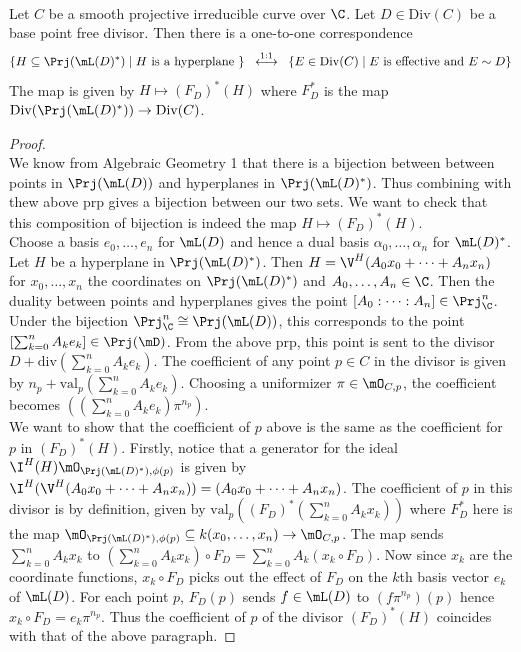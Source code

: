 \documentclass[a4paper]{article}
\begin{document}
\begin{prp}{}{}\\
Let $C$ be a smooth projective irreducible curve over $\C$. Let $D\in\text{Div}(C)$ be a base point free divisor. Then there is a one-to-one correspondence $$\{H\subseteq\Prj(\mL(D)^\ast)\;|\;H\text{ is a hyperplane }\}\;\;\overset{1:1}{\longleftrightarrow}\;\;\{E\in\text{Div}(C)\;|\;E\text{ is effective and }E\sim D\}$$ The map is given by $H\mapsto(F_D)^\ast(H)$ where $F_D^\ast$ is the map $\text{Div}(\Prj(\mL(D)^\ast))\to\text{Div}(C)$. 
\begin{proof}\\
We know from Algebraic Geometry 1 that there is a bijection between between points in $\Prj(\mL(D))$ and hyperplanes in $\Prj(\mL(D)^\ast)$. Thus combining with thew above prp gives a bijection between our two sets. We want to check that this composition of bijection is indeed the map $H\mapsto(F_D)^\ast(H)$. \\

Choose a basis $e_0,\dots,e_n$ for $\mL(D)$ and hence a dual basis $\alpha_0,\dots,\alpha_n$ for $\mL(D)^\ast$. Let $H$ be a hyperplane in $\Prj(\mL(D)^\ast)$. Then $H=\V^H(A_0x_0+\dots+A_nx_n)$ for $x_0,\dots,x_n$ the coordinates on $\Prj(\mL(D)^\ast)$ and $A_0,\dots,A_n\in\C$. Then the duality between points and hyperplanes gives the point $[A_0:\cdots:A_n]\in\Prj_\C^n$. Under the bijection $\Prj_\C^n\cong\Prj(\mL(D))$, this corresponds to the point $\left[\sum_{k=0}^nA_ke_k\right]\in\Prj(\mD)$. From the above prp, this point is sent to the divisor $D+\text{div}\left(\sum_{k=0}^nA_ke_k\right)$. The coefficient of any point $p\in C$ in the divisor is given by $n_p+\text{val}_p\left(\sum_{k=0}^nA_ke_k\right)$. Choosing a uniformizer $\pi\in\mO_{C,p}$, the coefficient becomes $\left(\left(\sum_{k=0}^nA_ke_k\right)\pi^{n_p}\right)$. \\

We want to show that the coefficient of $p$ above is the same as the coefficient for $p$ in $(F_D)^\ast(H)$. Firstly, notice that a generator for the ideal $\I^H(H)\mO_{\Prj(\mL(D)^\ast),\phi(p)}$ is given by $\I^H(\V^H(A_0x_0+\dots+A_nx_n))=(A_0x_0+\dots+A_nx_n)$. The coefficient of $p$ in this divisor is by definition, given by $\text{val}_p\left((F_D)^\ast\left(\sum_{k=0}^nA_kx_k\right)\right)$ where $F_D^\ast$ here is the map $\mO_{\Prj(\mL(D)^\ast),\phi(p)}\subseteq k(x_0,\dots,x_n)\to\mO_{C,p}$. The map sends $\sum_{k=0}^nA_kx_k$ to $\left(\sum_{k=0}^nA_kx_k\right)\circ F_D=\sum_{k=0}^nA_k(x_k\circ F_D)$. Now since $x_k$ are the coordinate functions, $x_k\circ F_D$ picks out the effect of $F_D$ on the $k$th basis vector $e_k$ of $\mL(D)$. For each point $p$, $F_D(p)$ sends $f\in\mL(D)$ to $(f\pi^{n_p})(p)$ hence $x_k\circ F_D=e_k\pi^{n_p}$. Thus the coefficient of $p$ of the divisor $(F_D)^\ast(H)$ coincides with that of the above paragraph. 
\end{proof}
\end{prp}
\end{document}
